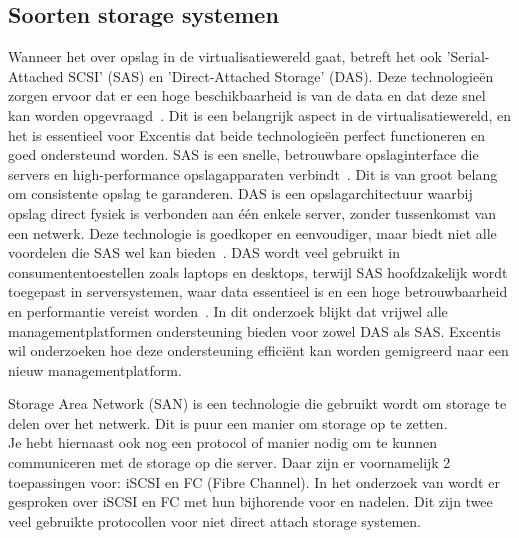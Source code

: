 \subsection{Soorten storage systemen}\label{subsec:storage}
Wanneer het over opslag in de virtualisatiewereld gaat, betreft het ook 'Serial-Attached SCSI' (SAS) en 'Direct-Attached Storage' (DAS). Deze technologieën zorgen ervoor dat er een hoge beschikbaarheid is van de data en dat deze snel kan worden opgevraagd~\autocite{griswold2002storage}. Dit is een belangrijk aspect in de virtualisatiewereld, en het is essentieel voor Excentis dat beide technologieën perfect functioneren en goed ondersteund worden.
SAS is een snelle, betrouwbare opslaginterface die servers en high-performance opslagapparaten verbindt~\autocite{aravindan2014performance}. Dit is van groot belang om consistente opslag te garanderen.
DAS is een opslagarchitectuur waarbij opslag direct fysiek is verbonden aan één enkele server, zonder tussenkomst van een netwerk. Deze technologie is goedkoper en eenvoudiger, maar biedt niet alle voordelen die SAS wel kan bieden~\autocite{griswold2002storage}.
DAS wordt veel gebruikt in consumententoestellen zoals laptops en desktops, terwijl SAS hoofdzakelijk wordt toegepast in serversystemen, waar data essentieel is en een hoge betrouwbaarheid en performantie vereist worden~\autocite{griswold2002storage}.
In dit onderzoek blijkt dat vrijwel alle managementplatformen ondersteuning bieden voor zowel DAS als SAS. Excentis wil onderzoeken hoe deze ondersteuning efficiënt kan worden gemigreerd naar een nieuw managementplatform.

Storage Area Network (SAN) \textcite{ibm2025san} is een technologie die gebruikt wordt om storage te delen over het netwerk.
Dit is puur een manier om storage op te zetten. \\
Je hebt hiernaast ook nog een protocol of manier nodig om te kunnen communiceren met de storage op die server.
Daar zijn er voornamelijk 2 toepassingen voor: iSCSI en FC (Fibre Channel).
In het onderzoek van \textcite{stonefly2023fcvsiscsi} wordt er gesproken over iSCSI en FC met hun bijhorende voor en nadelen. Dit zijn twee veel gebruikte protocollen voor niet direct attach storage systemen.

